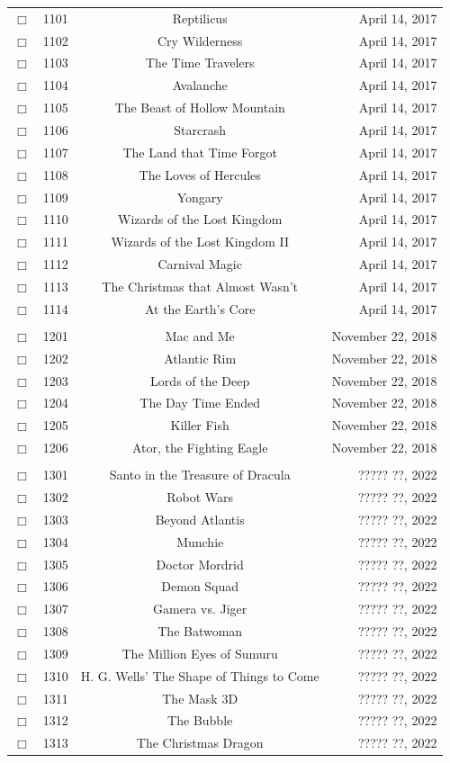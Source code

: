\documentclass[12pt]{article}
\begin{document}
\begin{center}
\begin{longtable}[c]{cccr}
\\  %
$\Box$&1101&Reptilicus&April 14, 2017\\
$\Box$&1102&Cry Wilderness&April 14, 2017\\
$\Box$&1103&The Time Travelers&April 14, 2017\\
$\Box$&1104&Avalanche&April 14, 2017\\
$\Box$&1105&The Beast of Hollow Mountain&April 14, 2017\\
$\Box$&1106&Starcrash&April 14, 2017\\
$\Box$&1107&The Land that Time Forgot&April 14, 2017\\
$\Box$&1108&The Loves of Hercules&April 14, 2017\\
$\Box$&1109&Yongary&April 14, 2017\\
$\Box$&1110&Wizards of the Lost Kingdom&April 14, 2017\\
$\Box$&1111&Wizards of the Lost Kingdom II&April 14, 2017\\
$\Box$&1112&Carnival Magic&April 14, 2017\\
$\Box$&1113&The Christmas that Almost Wasn't&April 14, 2017\\
$\Box$&1114&At the Earth's Core&April 14, 2017\\  %

\\  %
$\Box$&1201&Mac and Me&November 22, 2018\\
$\Box$&1202&Atlantic Rim&November 22, 2018\\
$\Box$&1203&Lords of the Deep&November 22, 2018\\
$\Box$&1204&The Day Time Ended&November 22, 2018\\
$\Box$&1205&Killer Fish&November 22, 2018\\
$\Box$&1206&Ator, the Fighting Eagle&November 22, 2018\\  %

\\  %
$\Box$&1301&Santo in the Treasure of Dracula&????? ??, 2022\\
$\Box$&1302&Robot Wars&????? ??, 2022\\
$\Box$&1303&Beyond Atlantis&????? ??, 2022\\
$\Box$&1304&Munchie&????? ??, 2022\\
$\Box$&1305&Doctor Mordrid&????? ??, 2022\\
$\Box$&1306&Demon Squad&????? ??, 2022\\
$\Box$&1307&Gamera vs. Jiger&????? ??, 2022\\
$\Box$&1308&The Batwoman&????? ??, 2022\\
$\Box$&1309&The Million Eyes of Sumuru&????? ??, 2022\\
$\Box$&1310&H. G. Wells' The Shape of Things to Come&????? ??, 2022\\
$\Box$&1311&The Mask 3D&????? ??, 2022\\
$\Box$&1312&The Bubble&????? ??, 2022\\
$\Box$&1313&The Christmas Dragon&????? ??, 2022\\  %

\end{longtable}\end{center}
\end{document}
